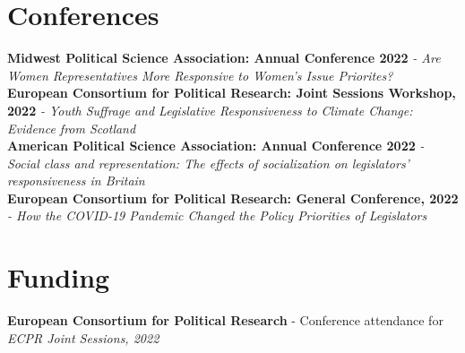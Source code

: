 \documentclass[letterpaper,11pt]{article}
\begin{document}
\section{Conferences}
 \begin{itemize}[leftmargin=0.15in, label={}]
    \small{\item{
     \textbf{Midwest Political Science Association: Annual Conference 2022}{\textit{ - Are Women Representatives More Responsive to Women’s Issue Priorites?}} \\
     \textbf{European Consortium for Political Research: Joint Sessions Workshop, 2022}{\textit{ - Youth Suffrage and Legislative Responsiveness to Climate Change: Evidence from Scotland}} \\
     \textbf{American Political Science Association: Annual Conference 2022}{\textit{ - Social class and representation: The effects of socialization on legislators’ responsiveness in Britain}} \\
     \textbf{European Consortium for Political Research: General Conference, 2022}{\textit{ - How the COVID-19 Pandemic Changed the Policy Priorities of Legislators}} \\
    }}
 \end{itemize}
 
\section{Funding}
 \begin{itemize}[leftmargin=0.15in, label={}]
    \small{\item{
     \textbf{European Consortium for Political Research}{ - Conference attendance for \textit{ECPR Joint Sessions, 2022}} \\
    }}
 \end{itemize}





\end{document}
